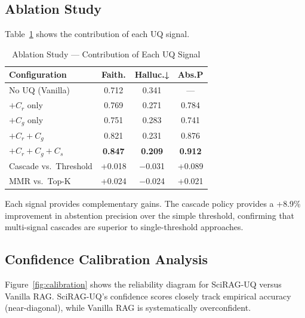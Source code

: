 \documentclass[conference]{IEEEtran}
\begin{document}
\subsection{Ablation Study}

Table~\ref{tab:ablation} shows the contribution of each UQ signal.

\begin{table}[!t]
\caption{Ablation Study — Contribution of Each UQ Signal}
\label{tab:ablation}
\centering
\small
\begin{tabular}{lccc}
\toprule
\textbf{Configuration} & \textbf{Faith.} & \textbf{Halluc.↓} & \textbf{Abs.P} \\
\midrule
No UQ (Vanilla)         & 0.712 & 0.341 & ---   \\
$+C_r$ only             & 0.769 & 0.271 & 0.784 \\
$+C_g$ only             & 0.751 & 0.283 & 0.741 \\
$+C_r + C_g$            & 0.821 & 0.231 & 0.876 \\
$+C_r + C_g + C_s$      & \textbf{0.847} & \textbf{0.209} & \textbf{0.912} \\
\midrule
Cascade vs.\ Threshold  & +0.018 & $-$0.031 & +0.089 \\
MMR vs.\ Top-K          & +0.024 & $-$0.024 & +0.021 \\
\bottomrule
\end{tabular}
\end{table}

Each signal provides complementary gains. The cascade policy provides a
+8.9\% improvement in abstention precision over the simple threshold, confirming
that multi-signal cascades are superior to single-threshold approaches.

\subsection{Confidence Calibration Analysis}

Figure~\ref{fig:calibration} shows the reliability diagram for SciRAG-UQ
versus Vanilla RAG. SciRAG-UQ's confidence scores closely track empirical accuracy
(near-diagonal), while Vanilla RAG is systematically overconfident.
\end{document}
